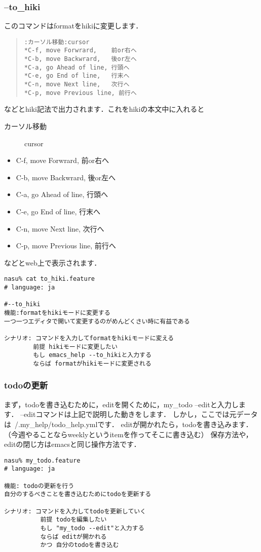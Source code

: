 \subsubsection{--to\_hiki}
このコマンドはformatをhikiに変更します．
\begin{quote}\begin{verbatim}
:カーソル移動:cursor
*C-f, move Forwrard,    前or右へ
*C-b, move Backwrard,   後or左へ
*C-a, go Ahead of line, 行頭へ
*C-e, go End of line,   行末へ
*C-n, move Next line,   次行へ
*C-p, move Previous line, 前行へ
\end{verbatim}\end{quote}
などとhiki記法で出力されます．これをhikiの本文中に入れると
\begin{description}
\item[カーソル移動] cursor

\end{description}
\begin{itemize}
\item C-f, move Forwrard,    前or右へ
\item C-b, move Backwrard,   後or左へ
\item C-a, go Ahead of line, 行頭へ
\item C-e, go End of line,   行末へ
\item C-n, move Next line,   次行へ
\item C-p, move Previous line, 前行へ
\end{itemize}
などとweb上で表示されます．
\begin{lstlisting}[style=customRuby,basicstyle={\scriptsize\ttfamily}]
nasu% cat to_hiki.feature
# language: ja

#--to_hiki
機能:formatをhikiモードに変更する
一つ一つエディタで開いて変更するのがめんどくさい時に有益である

シナリオ: コマンドを入力してformatをhikiモードに変える
        前提 hikiモードに変更したい
        もし emacs_help --to_hikiと入力する
        ならば formatがhikiモードに変更される
\end{lstlisting}
\subsubsection{todoの更新}
まず，todoを書き込むために，editを開くために，my\_todo --editと入力します．
--editコマンドは上記で説明した動きをします．
しかし，ここでは元データは~/.my\_help/todo\_help.ymlです．
editが開かれたら，todoを書き込みます．（今週やることならweeklyというitemを作ってそこに書き込む）
保存方法や，editの閉じ方はemacsと同じ操作方法です．
\begin{lstlisting}[style=customRuby,basicstyle={\scriptsize\ttfamily}]
nasu% my_todo.feature
# language: ja

機能: todoの更新を行う
自分のするべきことを書き込むためにtodoを更新する

シナリオ: コマンドを入力してtodoを更新していく
          前提 todoを編集したい
          もし "my_todo --edit"と入力する
          ならば editが開かれる
          かつ 自分のtodoを書き込む

\end{lstlisting}
